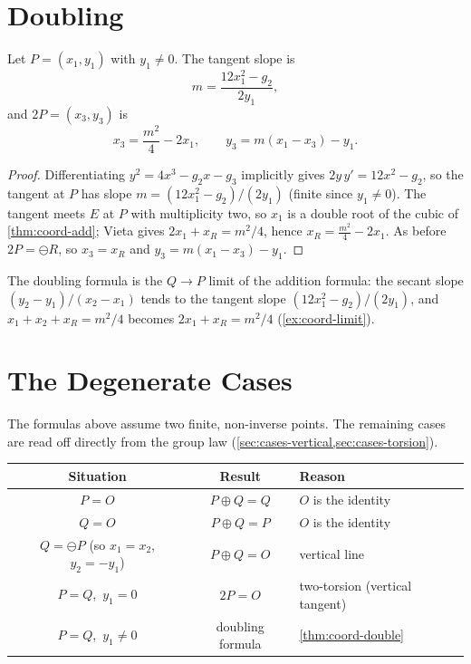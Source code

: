 \section{Doubling}
\label{sec:coord-double}

\begin{theorem}
\label{thm:coord-double}
Let \(P = (x_1, y_1)\) with \(y_1 \ne 0\). The tangent slope is
\[
  m = \frac{12 x_1^2 - g_2}{2 y_1},
\]
and \(2P = (x_3, y_3)\) is
\[
  \boxed{\,x_3 = \frac{m^2}{4} - 2 x_1, \qquad
  y_3 = m(x_1 - x_3) - y_1 .\,}
\]
\end{theorem}

\begin{proof}
Differentiating \(y^2 = 4x^3 - g_2 x - g_3\) implicitly gives
\(2y\,y' = 12 x^2 - g_2\), so the tangent at \(P\) has slope
\(m = (12 x_1^2 - g_2)/(2 y_1)\) (finite since \(y_1 \ne 0\)). The tangent meets
\(E\) at \(P\) with multiplicity two, so \(x_1\) is a double root of the cubic of
\cref{thm:coord-add}; Vieta gives \(2x_1 + x_R = m^2/4\), hence
\(x_R = \tfrac{m^2}{4} - 2x_1\). As before \(2P = \ominus R\), so
\(x_3 = x_R\) and \(y_3 = m(x_1 - x_3) - y_1\).
\end{proof}

The doubling formula is the \(Q \to P\) limit of the addition formula: the secant
slope \((y_2 - y_1)/(x_2 - x_1)\) tends to the tangent slope \((12x_1^2 - g_2)/
(2y_1)\), and \(x_1 + x_2 + x_R = m^2/4\) becomes \(2x_1 + x_R = m^2/4\)
(\cref{ex:coord-limit}).

\section{The Degenerate Cases}
\label{sec:coord-special}

The formulas above assume two finite, non-inverse points. The remaining cases are
read off directly from the group law (\cref{sec:cases-vertical,sec:cases-torsion}).

\begin{center}
\begin{tabular}{c|c|l}
Situation & Result & Reason\\
\hline
\(P = O\) & \(P \oplus Q = Q\) & \(O\) is the identity\\
\(Q = O\) & \(P \oplus Q = P\) & \(O\) is the identity\\
\(Q = \ominus P\) (so \(x_1 = x_2\), \(y_2 = -y_1\)) & \(P \oplus Q = O\) & vertical line\\
\(P = Q\),\ \(y_1 = 0\) & \(2P = O\) & two-torsion (vertical tangent)\\
\(P = Q\),\ \(y_1 \ne 0\) & doubling formula & \cref{thm:coord-double}
\end{tabular}
\end{center}

